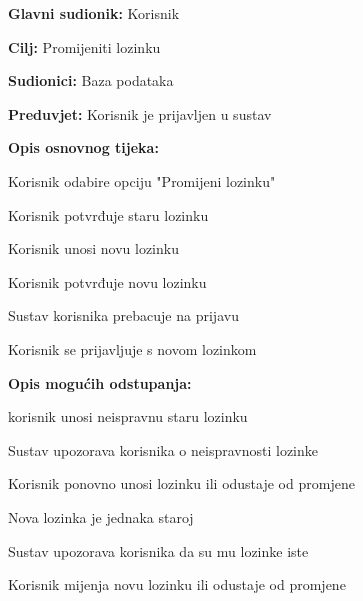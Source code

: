 				\noindent {}
				\begin{packed_item}
					
					\item \textbf{Glavni sudionik: }Korisnik
					\item  \textbf{Cilj: }Promijeniti lozinku
					\item  \textbf{Sudionici: }Baza podataka
					\item  \textbf{Preduvjet: }Korisnik je prijavljen u sustav
					\item  \textbf{Opis osnovnog tijeka: }
					
					\item[] \begin{packed_enum}
						
						\item Korisnik odabire opciju "Promijeni lozinku"
						\item Korisnik potvrđuje staru lozinku
						\item Korisnik unosi novu lozinku
						\item Korisnik potvrđuje novu lozinku
						\item Sustav korisnika prebacuje na prijavu
						\item Korisnik se prijavljuje s novom lozinkom
					\end{packed_enum}
					
					\item  \textbf{Opis mogućih odstupanja:}
					
					\item[] \begin{packed_item}
						
						\item[2.a] korisnik unosi neispravnu staru lozinku
						\item[] \begin{packed_enum}
							
							\item Sustav upozorava korisnika o neispravnosti lozinke
							\item Korisnik ponovno unosi lozinku ili odustaje od promjene
							
						\end{packed_enum}
						\item[3.a] Nova lozinka je jednaka staroj
						\item[]\begin{packed_enum}
							
							\item Sustav upozorava korisnika da su mu lozinke iste
							\item Korisnik mijenja novu lozinku ili odustaje od promjene
							
						\end{packed_enum}
						
					\end{packed_item}
				\end{packed_item}
				
